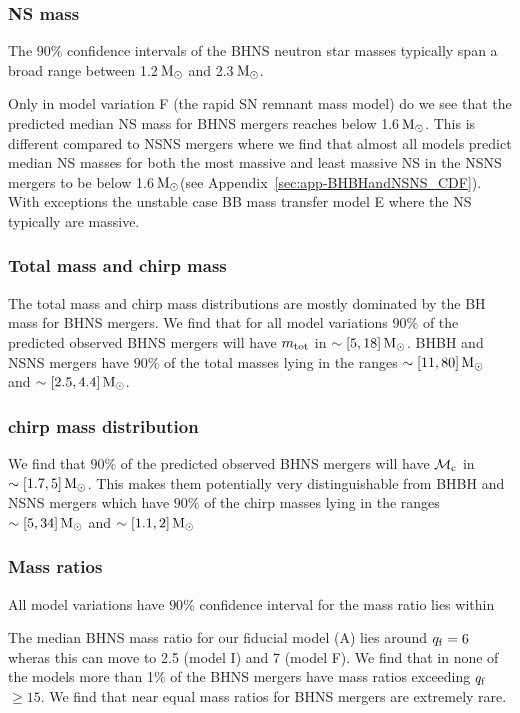 \documentclass[twocolumn]{aastex63}
\newcommand\bhnsSingle{BHNS\xspace}
\newcommand{\Msun}{\ensuremath{\,\rm{M}_{\odot}}\xspace}
\newcommand{\mtotf}{\ensuremath{m_{\rm{tot}}}\xspace}
\newcommand{\mchirpf}{\ensuremath{{\mathcal{M}}_{\rm{c}}}\xspace}
\newcommand{\qf}{\ensuremath{q_{\rm{f}}}\xspace}
\begin{document}
\subsubsection{NS mass}
The $90\%$ confidence intervals of the \bhnsSingle neutron star masses typically span a broad range between 1.2\Msun and 2.3\Msun. 

Only in model variation F (the rapid SN remnant mass model) do we see that the predicted median \ac{NS} mass for \bhnsSingle mergers reaches below 1.6\Msun.  This is different compared to NSNS mergers where we find that almost all models predict median \ac{NS} masses for both the most massive and least massive \ac{NS} in the NSNS mergers to be below 1.6\Msun (see Appendix~\ref{sec:app-BHBHandNSNS_CDF}). With exceptions the  unstable case BB mass transfer model E where the \ac{NS} typically are massive. 



\subsubsection{Total mass and chirp mass}
The total mass and chirp mass distributions are mostly dominated by the \ac{BH} mass for \ac{BHNS} mergers. We find that for all model variations $90\%$ of the predicted observed \bhnsSingle mergers will have $\mtotf$  in  $\sim [5, 18]\Msun$. 
BHBH and NSNS mergers have  $90\%$ of the total masses lying in the ranges $\sim[11, 80 ]\Msun$ and  $\sim[2.5, 4.4]\Msun$.


\subsubsection{chirp mass distribution}
We find that  $90\%$ of the predicted observed \bhnsSingle mergers will have  \mchirpf  in  $\sim [1.7, 5]\Msun$.  This makes them potentially very distinguishable from BHBH and NSNS mergers which have $90\%$ of the chirp masses lying in the ranges $\sim[5, 34]\Msun$ and $\sim[1.1, 2]\Msun$

\subsubsection{Mass ratios}
All model variations have $90\%$ confidence interval for the mass ratio lies within 

The median \bhnsSingle mass ratio for our fiducial model (A) lies around  $\qf = 6$ wheras this can move to 2.5 (model I)   and 7 (model F).  We find that in none of the models more than 1$\%$ of the \bhnsSingle mergers have mass ratios exceeding \qf $\geq 15$.  We find that near equal mass ratios for \bhnsSingle mergers are extremely rare. 
\end{document}
